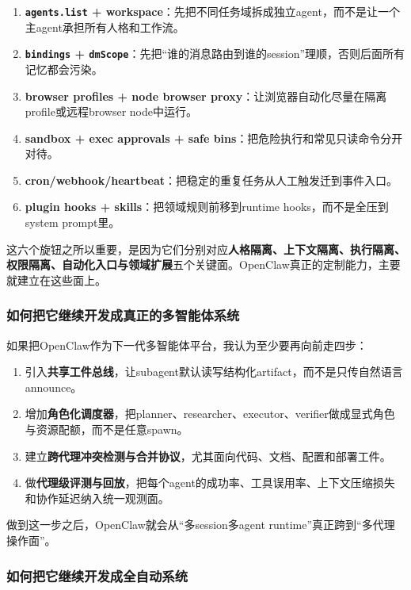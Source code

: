 \documentclass[12pt,a4paper]{article}
\begin{document}
\begin{enumerate}
    \item \textbf{\texttt{agents.list} + workspace}：先把不同任务域拆成独立agent，而不是让一个主agent承担所有人格和工作流。
    \item \textbf{\texttt{bindings} + \texttt{dmScope}}：先把“谁的消息路由到谁的session”理顺，否则后面所有记忆都会污染。
    \item \textbf{browser profiles + node browser proxy}：让浏览器自动化尽量在隔离profile或远程browser node中运行。
    \item \textbf{sandbox + exec approvals + safe bins}：把危险执行和常见只读命令分开对待。
    \item \textbf{cron/webhook/heartbeat}：把稳定的重复任务从人工触发迁到事件入口。
    \item \textbf{plugin hooks + skills}：把领域规则前移到runtime hooks，而不是全压到system prompt里。
\end{enumerate}

这六个旋钮之所以重要，是因为它们分别对应\textbf{人格隔离、上下文隔离、执行隔离、权限隔离、自动化入口与领域扩展}五个关键面。OpenClaw真正的定制能力，主要就建立在这些面上。

\subsubsection{如何把它继续开发成真正的多智能体系统}

如果把OpenClaw作为下一代多智能体平台，我认为至少要再向前走四步：

\begin{enumerate}
    \item 引入\textbf{共享工件总线}，让subagent默认读写结构化artifact，而不是只传自然语言announce。
    \item 增加\textbf{角色化调度器}，把planner、researcher、executor、verifier做成显式角色与资源配额，而不是任意spawn。
    \item 建立\textbf{跨代理冲突检测与合并协议}，尤其面向代码、文档、配置和部署工件。
    \item 做\textbf{代理级评测与回放}，把每个agent的成功率、工具误用率、上下文压缩损失和协作延迟纳入统一观测面。
\end{enumerate}

做到这一步之后，OpenClaw就会从“多session多agent runtime”真正跨到“多代理操作面”。

\subsubsection{如何把它继续开发成全自动系统}
\end{document}
